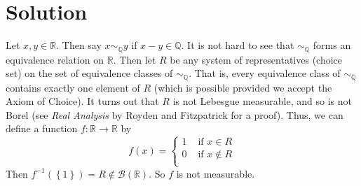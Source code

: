 \documentclass[12pt]{article}
\begin{document}
\section*{Solution}
Let $x,y \in \mathbb{R}$. Then say $x \sim_{\mathbb{Q}} y$ if $x - y \in \mathbb{Q}$. It is not hard to see that $\sim_{\mathbb{Q}}$ forms an
equivalence relation on $\mathbb{R}$. Then let $R$ be any system of representatives (choice set) on the set of equivalence classes of
$\sim_{\mathbb{Q}}$. That is,
every equivalence class of $\sim_{\mathbb{Q}}$ contains exactly one element of $R$ (which is possible provided we accept the Axiom of Choice). It turns out that $R$ is not Lebesgue measurable, and so is not
Borel (see \emph{Real Analysis} by Royden and Fitzpatrick for a proof). Thus, we can define a function $f : \mathbb{R} \rightarrow \mathbb{R}$ by 
\[ f(x) = \left\{ \begin{array}{cl}
1 & \text{ if } x \in R \\
0 & \text{ if } x \notin R \\
\end{array} \right. \]
Then $f^{-1}(\left\{ 1 \right\}) = R \notin \mathcal{B}(\mathbb{R})$. So $f$ is not measurable.
\end{document}
